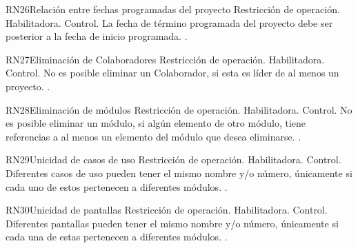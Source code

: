 \begin{BussinesRule}{RN26}{Relación entre fechas programadas del proyecto} 
	\BRitem[Tipo:] Restricción de operación. 
	\BRitem[Clase:] Habilitadora. 
	\BRitem[Nivel:] Control. %
	\BRitem[Descripción:] La fecha de término programada del proyecto debe ser posterior a la fecha de inicio programada.
	 \UCref{}{}. 
\end{BussinesRule}

\begin{BussinesRule}{RN27}{Eliminación de Colaboradores} 
	\BRitem[Tipo:] Restricción de operación. 
	\BRitem[Clase:] Habilitadora. 
	\BRitem[Nivel:] Control. %
	\BRitem[Descripción:] No es posible eliminar un Colaborador, si esta es líder de al menos un proyecto.
	 \UCref{}{}. 
\end{BussinesRule}

\begin{BussinesRule}{RN28}{Eliminación de módulos} 
	\BRitem[Tipo:] Restricción de operación. 
	\BRitem[Clase:] Habilitadora. 
	\BRitem[Nivel:] Control. %
	\BRitem[Descripción:] No es posible eliminar un módulo, si algún elemento de otro módulo, tiene referencias a al menos un elemento del módulo que desea eliminarse.
	 \UCref{}{}. 
\end{BussinesRule}

\begin{BussinesRule}{RN29}{Unicidad de casos de uso} 
	\BRitem[Tipo:] Restricción de operación. 
	\BRitem[Clase:] Habilitadora. 
	\BRitem[Nivel:] Control. %
	\BRitem[Descripción:] Diferentes casos de uso pueden tener el mismo nombre y/o número, únicamente si cada uno de estos pertenecen a diferentes módulos.
	 \UCref{}{}. 
\end{BussinesRule}

\begin{BussinesRule}{RN30}{Unicidad de pantallas} 
	\BRitem[Tipo:] Restricción de operación. 
	\BRitem[Clase:] Habilitadora. 
	\BRitem[Nivel:] Control. %
	\BRitem[Descripción:] Diferentes pantallas pueden tener el mismo nombre y/o número, únicamente si cada una de estas pertenecen a diferentes módulos.
	 \UCref{}{}. 
\end{BussinesRule}


